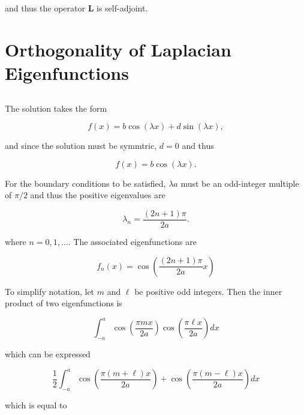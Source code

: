 \documentclass{hw-template}
\begin{document}
and thus the operator $\mathbf{L}$ is self-adjoint.

\section{Orthogonality of Laplacian Eigenfunctions}

\subsection{}

The solution takes the form

\begin{equation}
    f(x) = b\cos(\lambda x) + d\sin(\lambda x),
\end{equation}

and since the solution must be symmtric, $d = 0$ and thus

\begin{equation}
    f(x) = b\cos(\lambda x).
\end{equation}

For the boundary conditions to be satisfied, $\lambda a$ must be an odd-integer multiple of $\pi/2$ and thus the positive eigenvalues are

\begin{equation}
    \lambda_n = \frac{(2n+1)\pi}{2a}.
\end{equation}

where $n=0, 1, \dots$. The associated eigenfunctions are

\begin{equation}
    f_n(x) = \cos \left(\frac{(2n+1)\pi}{2a} x \right)
\end{equation}

To simplify notation, let $m$ and $\ell$ be positive odd integers. Then the inner product of two eigenfunctions is

\begin{equation}\label{eq:og-integral}
    \int_{-a}^a \cos \left(\frac{\pi m x}{2a} \right)\cos\left(\frac{\pi \ell x}{2a} \right)dx
\end{equation}

which can be expressed

\begin{equation}
    \frac{1}{2}\int_{-a}^a \cos \left(\frac{\pi (m+\ell) x}{2a} \right) + \cos\left(\frac{\pi (m - \ell) x}{2a} \right)dx
\end{equation}

which is equal to 
\end{document}
